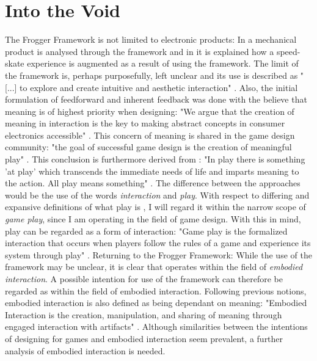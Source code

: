 \section{Into the Void}
The Frogger Framework is not limited to electronic products: In  a mechanical product is analysed through the framework and in  it is explained how a speed-skate experience is augmented as a result of using the framework. The limit of the framework is, perhaps purposefully, left unclear and its use is described as "[...] to explore and create intuitive and aesthetic interaction" \cite[p. 22]{transbehav}. Also, the initial formulation of feedforward and inherent feedback was done with the believe that meaning is of highest priority when designing: "We argue that the creation of meaning in interaction is the key to making abstract concepts in consumer electronics accessible" \cite[p. 2]{howdonald}. This concern of meaning is shared in the game design community: "the goal of successful game design is the creation of meaningful play" \cite[ch. 3, p. 3]{salen}. This conclusion is furthermore derived from \cite{huizinga}: "In play there is something 'at play' which transcends the immediate needs of life and imparts meaning to the action. All play means something" \cite[p. 1]{huizinga}. The difference between the approaches would be the use of the words \textit{interaction} and \textit{play}. With respect to differing and expansive definitions of what play is \cite{huizinga, sicartplay, salen}, I will regard it within the narrow scope of \textit{game play}, since I am operating in the field of game design. With this in mind, play can be regarded as a form of interaction: "Game play is the formalized interaction that occurs when players follow the rules of a game and experience its system through play" \cite[ch. 22, p. 3]{salen}.
Returning to the Frogger Framework: While the use of the framework may be unclear, it is clear that  operates within the field of \textit{embodied interaction}. A possible intention for use of the framework can therefore be regarded as within the field of embodied interaction. Following previous notions, embodied interaction is also defined as being dependant on meaning: "Embodied Interaction is the creation, manipulation, and sharing of meaning through engaged interaction with artifacts" \cite[p. 126]{dourish}. Although similarities between the intentions of designing for games \cite{salen} and embodied interaction \cite{dourish} seem prevalent, a further analysis of embodied interaction is needed.

